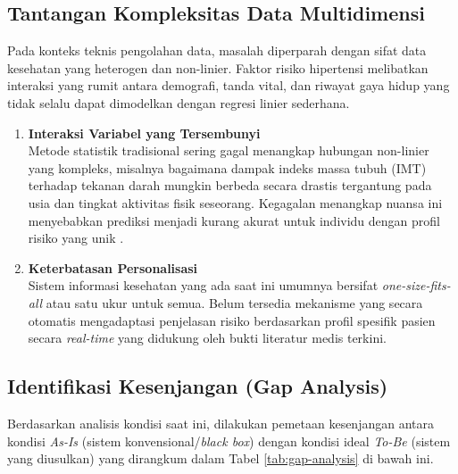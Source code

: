 \subsection{Tantangan Kompleksitas Data Multidimensi}
Pada konteks teknis pengolahan data, masalah diperparah dengan sifat data kesehatan yang heterogen dan non-linier. Faktor risiko hipertensi melibatkan interaksi yang rumit antara demografi, tanda vital, dan riwayat gaya hidup yang tidak selalu dapat dimodelkan dengan regresi linier sederhana.
\begin{enumerate}
    \item \textbf{Interaksi Variabel yang Tersembunyi}\\
    Metode statistik tradisional sering gagal menangkap hubungan non-linier yang kompleks, misalnya bagaimana dampak indeks massa tubuh (IMT) terhadap tekanan darah mungkin berbeda secara drastis tergantung pada usia dan tingkat aktivitas fisik seseorang. Kegagalan menangkap nuansa ini menyebabkan prediksi menjadi kurang akurat untuk individu dengan profil risiko yang unik \autocite{Elshawi2019Interpretability}.
    
    \item \textbf{Keterbatasan Personalisasi}\\
    Sistem informasi kesehatan yang ada saat ini umumnya bersifat \emph{one-size-fits-all} atau satu ukur untuk semua. Belum tersedia mekanisme yang secara otomatis mengadaptasi penjelasan risiko berdasarkan profil spesifik pasien secara \emph{real-time} yang didukung oleh bukti literatur medis terkini.
\end{enumerate}

\subsection{Identifikasi Kesenjangan (Gap Analysis)}
Berdasarkan analisis kondisi saat ini, dilakukan pemetaan kesenjangan antara kondisi \emph{As-Is} (sistem konvensional/\textit{black box}) dengan kondisi ideal \emph{To-Be} (sistem yang diusulkan) yang dirangkum dalam Tabel \ref{tab:gap-analysis} di bawah ini.

